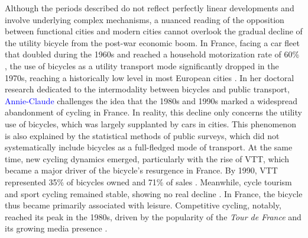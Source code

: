 \begin{refsegment}
Although the periods described do not reflect perfectly linear developments and involve underlying complex mechanisms, a nuanced reading of the opposition between functional cities and modern cities cannot overlook the gradual decline of the utility bicycle from the post-war economic boom. In France, facing a car fleet that doubled during the 1960s and reached a household motorization rate of 60\% \textcolor{blue}{\autocite[43]{flonneau_georges_1999}}, the use of bicycles as a utility transport mode significantly dropped in the 1970s, reaching a historically low level in most European cities \textcolor{blue}{\autocite[41]{eskenazi_voir_2022}}. In her doctoral research dedicated to the intermodality between bicycles and public transport, \textcolor{blue}{Annie-Claude} \textcolor{blue}{\textcite[53]{sebban_complementarite_2003}} challenges the idea that the 1980s and 1990s marked a widespread abandonment of cycling in France. In reality, this decline only concerns the utility use of bicycles, which was largely supplanted by cars in cities. This phenomenon is also explained by the statistical methods of public surveys, which did not systematically include bicycles as a full-fledged mode of transport. At the same time, new cycling dynamics emerged, particularly with the rise of \acrfull{VTT}, which became a major driver of the bicycle's resurgence in France. By 1990, \acrshort{VTT} represented 35\% of bicycles owned and 71\% of sales \textcolor{blue}{\autocite[195]{dauncey_french_2012}}. Meanwhile, cycle tourism and sport cycling remained stable, showing no real decline \textcolor{blue}{\autocite[53]{sebban_complementarite_2003}}. In France, the bicycle thus became primarily associated with leisure. Competitive cycling, notably, reached its peak in the 1980s, driven by the popularity of the \textsl{Tour de France} and its growing media presence \textcolor{blue}{\autocite[196]{dauncey_french_2012}}.%


\end{refsegment}
